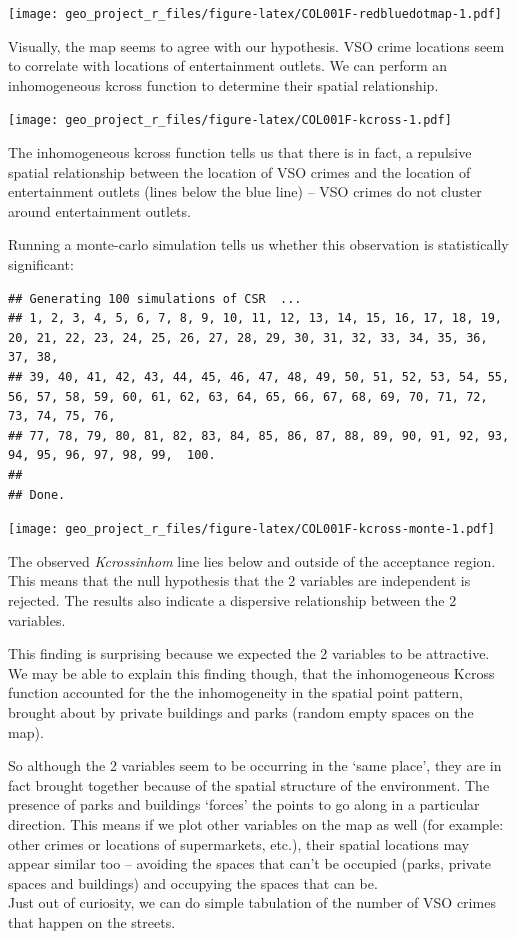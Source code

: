 \documentclass[]{article}
\theoremstyle{definition}
\theoremstyle{definition}
\theoremstyle{definition}
\theoremstyle{remark}
\begin{document}
\texttt{[image: geo\_project\_r\_files/figure-latex/COL001F-redbluedotmap-1.pdf]}

Visually, the map seems to agree with our hypothesis. VSO crime
locations seem to correlate with locations of entertainment outlets. We
can perform an inhomogeneous kcross function to determine their spatial
relationship.

\texttt{[image: geo\_project\_r\_files/figure-latex/COL001F-kcross-1.pdf]}

The inhomogeneous kcross function tells us that there is in fact, a
repulsive spatial relationship between the location of VSO crimes and
the location of entertainment outlets (lines below the blue line) -- VSO
crimes do not cluster around entertainment outlets.

Running a monte-carlo simulation tells us whether this observation is
statistically significant:

\begin{verbatim}
## Generating 100 simulations of CSR  ...
## 1, 2, 3, 4, 5, 6, 7, 8, 9, 10, 11, 12, 13, 14, 15, 16, 17, 18, 19, 20, 21, 22, 23, 24, 25, 26, 27, 28, 29, 30, 31, 32, 33, 34, 35, 36, 37, 38,
## 39, 40, 41, 42, 43, 44, 45, 46, 47, 48, 49, 50, 51, 52, 53, 54, 55, 56, 57, 58, 59, 60, 61, 62, 63, 64, 65, 66, 67, 68, 69, 70, 71, 72, 73, 74, 75, 76,
## 77, 78, 79, 80, 81, 82, 83, 84, 85, 86, 87, 88, 89, 90, 91, 92, 93, 94, 95, 96, 97, 98, 99,  100.
## 
## Done.
\end{verbatim}

\texttt{[image: geo\_project\_r\_files/figure-latex/COL001F-kcross-monte-1.pdf]}

The observed \emph{Kcrossinhom} line lies below and outside of the
acceptance region. This means that the null hypothesis that the 2
variables are independent is rejected. The results also indicate a
dispersive relationship between the 2 variables.

This finding is surprising because we expected the 2 variables to be
attractive. We may be able to explain this finding though, that the
inhomogeneous Kcross function accounted for the the inhomogeneity in the
spatial point pattern, brought about by private buildings and parks
(random empty spaces on the map).

So although the 2 variables seem to be occurring in the `same place',
they are in fact brought together because of the spatial structure of
the environment. The presence of parks and buildings `forces' the points
to go along in a particular direction. This means if we plot other
variables on the map as well (for example: other crimes or locations of
supermarkets, etc.), their spatial locations may appear similar too --
avoiding the spaces that can't be occupied (parks, private spaces and
buildings) and occupying the spaces that can be.\\
Just out of curiosity, we can do simple tabulation of the number of VSO
crimes that happen on the streets.
\end{document}
